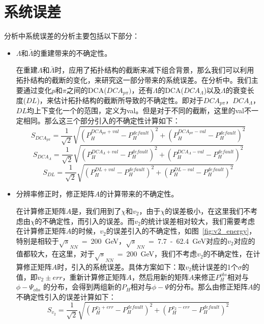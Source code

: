 \section{系统误差}
分析中系统误差的分析主要包括以下部分：
\begin{itemize}
\item $\Lambda$和$\bar{\Lambda}$的重建带来的不确定性。

在重建$\Lambda$和$\bar{\Lambda}$时，应用了拓扑结构的截断来减下组合背景，那么我们可以利用拓扑结构的截断的变化，来研究这一部分带来的系统误差。在分析中。我们主要通过变化$p$和$\pi$之间的DCA($DCA_{p\pi})$，还有$\Lambda$的DCA($DCA_{\Lambda}$)以及$\Lambda$的衰变长度($DL$)，来估计拓扑结构的截断所导致的不确定性。即对于$DCA_{p\pi}$，$DCA_{\Lambda}$，$DL$均上下变化一个的范围，定义为val。但是对于不同的截断，这里的val不一定相同。那么这三个部分引入的不确定性计算如下：
\begin{equation}
S_{DCA_{p\pi}} = \frac{1}{\sqrt{2}} \sqrt{(P_{H}^{DCA_{p\pi}+val} - P_{H}^{default})^2 + (P_{H}^{DCA_{p\pi}-val} - P_{H}^{default})^2}
\label{eq:sys_1}
\end{equation}
\begin{equation}
S_{DCA_{\Lambda}} = \frac{1}{\sqrt{2}} \sqrt{(P_{H}^{DCA_{\Lambda}+val} - P_{H}^{default})^2 + (P_{H}^{DCA_{\Lambda}-val} - P_{H}^{default})^2}
\label{eq:sys_2}
\end{equation}
\begin{equation}
S_{DL} = \frac{1}{\sqrt{2}} \sqrt{(P_{H}^{DL+val} - P_{H}^{default})^2 + (P_{H}^{DL-val} - P_{H}^{default})^2}
\label{eq:sys_3}
\end{equation}

\item 分辨率修正时，修正矩阵$A$的计算带来的不确定性。

在计算修正矩阵$A$是，我们用到了$\chi$和$v_{2}$，由于$\chi$的误差极小，在这里我们不考虑由$\chi$的不确定性，而引入的误差。而$v_{2}$的统计误差相对较大，我们需要考虑在计算修正矩阵$A$的时候，$v_{2}$的误差引入的不确定性，如图~\ref{fig:v2_energy}，特别是相较于$\sqrt{s}_{NN}$~=~200~GeV，$\sqrt{s}_{NN}$~=~7.7~-~62.4~GeV对应的$v_{2}$对应的值都较大，在这里，对于$\sqrt{s}_{NN}$~=~200~GeV，我们不考虑$v_{2}$的不确定性，在计算修正矩阵$A$时，引入的系统误差。具体方案如下：取$v_{2}$统计误差的1个$\sigma$的值，即$v_{2} \pm err$，重新计算修正矩阵$A$，然后用新的矩阵$A$来修正$P^{obs}_{H}$相对与$\phi-\Psi_{obs}$ 的分布，会得到两组新的$P_{H}$相对与$\phi-\Psi$的分布。那么由修正矩阵$A$的不确定性引入的误差计算如下：
\begin{equation}
S_{v_{2}} = \frac{1}{\sqrt{2}} \sqrt{(P_{H}^{v_{2}+err} - P_{H}^{default})^2 + (P_{H}^{v_{2}-err} - P_{H}^{default})^2}
\label{eq:sys_4}
\end{equation}
\end{itemize}

